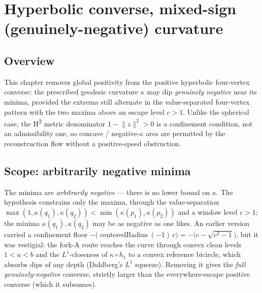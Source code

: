 \chapter{Hyperbolic converse, mixed-sign (genuinely-negative) curvature}
\label{chap:hyperbolic_mixed}


\section{Overview}

This chapter removes global positivity from the positive hyperbolic four-vertex converse: the prescribed geodesic curvature $\kappa$
may dip \emph{genuinely negative} near its minima, provided the extrema still
alternate in the value-separated four-vertex pattern with the two maxima above
an escape level $c>1$. Unlike the spherical case, the H\textsuperscript{2}
metric denominator $1-\lVert z\rVert^2>0$ is a confinement condition, not an
admissibility one, so concave / negative-$\kappa$ arcs are permitted by the
reconstruction flow without a positive-speed obstruction.

\section{Scope: arbitrarily negative minima}

The minima are \emph{arbitrarily negative} --- there is no lower bound on
$\kappa$. The hypothesis constrains only the maxima, through the value-separation
$\max(1,\kappa(q_1),\kappa(q_2))<\min(\kappa(p_1),\kappa(p_2))$ and a window level
$c>1$; the minima $\kappa(q_1),\kappa(q_2)$ may be as negative as one likes. An
earlier version carried a confinement floor
$-\bigl(\operatorname{centeredRadius}(-1)\,c\bigr)=-\bigl(c-\sqrt{c^2-1}\bigr)$,
but it was vestigial: the fork-A route reaches the curve through convex clean
levels $1<a<b$ and the $L^1$-closeness of $\kappa\circ h_1$ to a convex reference
bicircle, which absorbs dips of any depth (Dahlberg's $L^1$ squeeze). Removing it
gives the \emph{full genuinely-negative} converse, strictly larger than the
everywhere-escape positive converse (which it subsumes).

